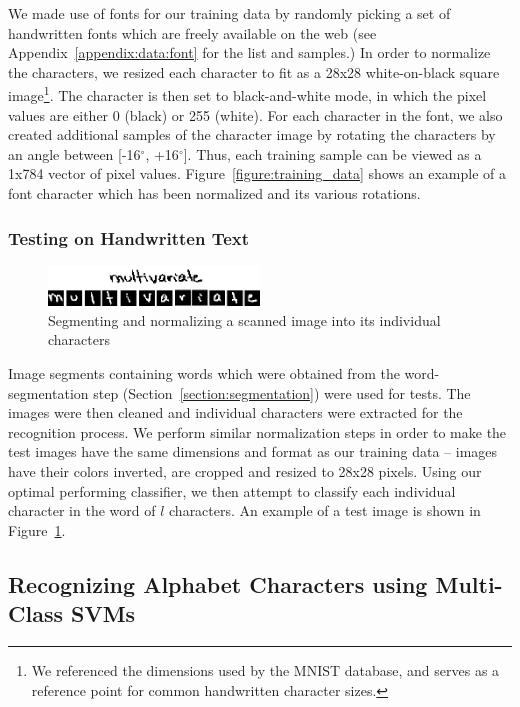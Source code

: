 \documentclass[12pt]{article}
\newcommand{\degree}{\ensuremath{^\circ}}
\begin{document}
		We made use of fonts for our training data by randomly picking a set of handwritten fonts which are freely available on the web (see Appendix~\ref{appendix:data:font} for the list and samples.) In order to normalize the characters, we resized each character to fit as a 28x28 white-on-black square image\footnote{We referenced the dimensions used by the MNIST database, and serves as a reference point for common handwritten character sizes.}. The character is then set to black-and-white mode, in which the pixel values are either 0 (black) or 255 (white). For each character in the font, we also created additional samples of the character image by rotating the characters by an angle between [-16\degree, +16\degree]. Thus, each training sample can be viewed as a 1x784 vector of pixel values. Figure~\ref{figure:training_data} shows an example of a font character which has been normalized and its various rotations.	
	
	\subsubsection{Testing on Handwritten Text}
		
		\begin{figure}[htbp!]
		\centering
		\includegraphics[width=0.5\textwidth]{multivariate_test.eps}
		\caption{Segmenting and normalizing a scanned image into its individual characters}
		\label{figure:multivariate_test}
		\end{figure}
		
		Image segments containing words which were obtained from the word-segmentation step (Section~\ref{section:segmentation}) were used for tests. The images were then cleaned and individual characters were extracted for the recognition process. We perform similar normalization steps in order to make the test images have the same dimensions and format as our training data -- images have their colors inverted, are cropped and resized to 28x28 pixels. Using our optimal performing classifier, we then attempt to classify each individual character in the word of $l$ characters. An example of a test image is shown in Figure~\ref{figure:multivariate_test}.
	
	\subsection{Recognizing Alphabet Characters using Multi-Class SVMs}
	\label{subsection:experiments:svm}
\end{document}
